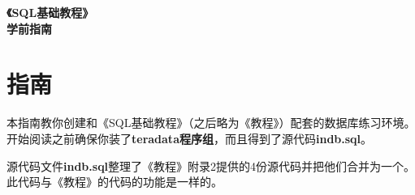 \documentclass{article}
\begin{document}
	\begin{titlepage}
   		\begin{center}
      		\LARGE\textbf{《SQL基础教程》}\\
      		\LARGE\textbf{学前指南}
   		\end{center}
	\end{titlepage}

	\section*{指南}
		本指南教你创建和《SQL基础教程》（之后略为《教程》）配套的数据库练习环境。
		开始阅读之前确保你装了\textbf{teradata程序组}，而且得到了源代码\textbf{indb.sql}。

		源代码文件\textbf{indb.sql}整理了《教程》附录2提供的4份源代码并把他们合并为一个。此代码与《教程》的代码的功能是一样的。





			



			
\end{document}
